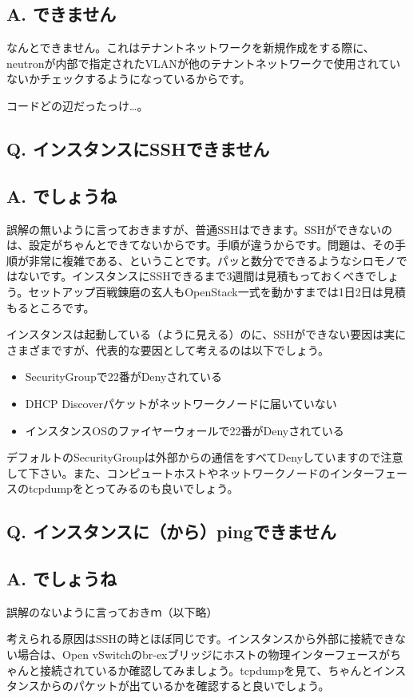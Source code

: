 \documentclass[9pt,b5paper,tombo,openany]{jsbook}
\begin{document}
\subsection*{A. できません}
なんとできません。これはテナントネットワークを新規作成をする際に、neutronが内部で指定されたVLANが他のテナントネットワークで使用されていないかチェックするようになっているからです。

コードどの辺だったっけ…。

\subsection*{Q. インスタンスにSSHできません}
\subsection*{A. でしょうね}
誤解の無いように言っておきますが、普通SSHはできます。SSHができないのは、設定がちゃんとできてないからです。手順が違うからです。問題は、その手順が非常に複雑である、ということです。パッと数分でできるようなシロモノではないです。インスタンスにSSHできるまで3週間は見積もっておくべきでしょう。セットアップ百戦錬磨の玄人もOpenStack一式を動かすまでは1日2日は見積もるところです。

インスタンスは起動している（ように見える）のに、SSHができない要因は実にさまざまですが、代表的な要因として考えるのは以下でしょう。
\begin{itemize}
	\item SecurityGroupで22番がDenyされている
	\item DHCP Discoverパケットがネットワークノードに届いていない
	\item インスタンスOSのファイヤーウォールで22番がDenyされている
\end{itemize}
デフォルトのSecurityGroupは外部からの通信をすべてDenyしていますので注意して下さい。また、コンピュートホストやネットワークノードのインターフェースのtcpdumpをとってみるのも良いでしょう。

\subsection*{Q. インスタンスに（から）pingできません}
\subsection*{A. でしょうね}
誤解のないように言っておきｍ（以下略）

考えられる原因はSSHの時とほぼ同じです。インスタンスから外部に接続できない場合は、Open vSwitchのbr-exブリッジにホストの物理インターフェースがちゃんと接続されているか確認してみましょう。tcpdumpを見て、ちゃんとインスタンスからのパケットが出ているかを確認すると良いでしょう。
\end{document}
